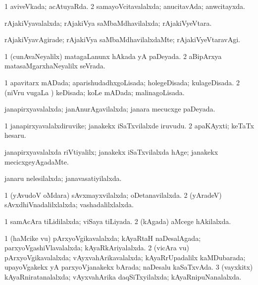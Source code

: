 \bentry
{} 
\gl{\gu}
\expl{}
\bmng
\bnum
\num{1} aviveVkada; acAtuyaRda. 
\num{2} samayoVcitavalalxda; anucitavAda; anwcitayxda. 
\enum
\emng
\eentry

\bentry
{} 
\gl{\gu}
\expl{}
\bmng
rAjakiVyavalalxda; rAjakiVya saMbaMdhavilalxda; rAjakiVyeVtara. 
\emng
\eentry

\bentry
{} 
\gl{\kirxvi}
\expl{}
\bmng
rAjakiVyavAgirade; rAjakiVya saMbaMdhavilalxdaMte; rAjakiVyeVtaravAgi. 
\emng
\eentry

\bentry
{} 
\gl{\gu}
\expl{}
\bmng
\bnum
\num{1} (cunAvaNeyalilx) matagaLanunx hAkada yA paDeyada. 
\num{2} aBipArxya matasaMgarxhaNeyalilx seVrada. 
\enum
\emng
\eentry

\bentry
{} 
\gl{\gu}
\expl{}
\bmng
\bnum
\num{1} apavitarx mADada; aparishudadhxgoLisada; holegeDisada; kulageDisada. 
\num{2} (niVru \mo vugaLa \vi) keDisada; koLe mADada; malinagoLisada. 
\enum
\emng
\eentry

\bentry
{} 
\gl{\gu}
\expl{}
\bmng
janapirxyavalalxda; janAnurAgavilalxda; janara mecucxge paDeyada. 
\emng
\eentry

\bentry
{} 
\gl{\nA}
\expl{}
\bmng
\bnum
\num{1} janapirxyavalalxdiruvike; janakekx iSaTxvilalxde iruvudu. 
\num{2} apaKAyxti; keTaTx hesaru. 
\enum
\emng
\eentry

\bentry
{} 
\gl{\kirxvi}
\expl{}
\bmng
janapirxyavalalxda riVtiyalilx; janakekx iSaTxvilalxda hAge; janakekx mecicxgeyAgadaMte. 
\emng
\eentry

\bentry
{} 
\gl{\gu}
\expl{}
\bmng
janaru nelesilalxda; janavasatiyilalxda. 
\emng
\eentry

\bentry
{} 
\gl{\gu}
\expl{}
\bmng
\bnum
\num{1} (yAvudoV oMdara) sAvxmayxvilalxda; oDetanavilalxda. 
\num{2} (yAradeV) sAvxdhiVnadalilxlalxda; vashadalilxlalxda. 
\enum
\emng
\eentry

\bentry
{} 
\gl{\gu}
\expl{}
\bmng
\bnum
\num{1} samAcAra tiLidilalxda; viSaya tiLiyada. 
\num{2} (kAgada) aMcege hAkilalxda. 
\enum
\emng
\eentry

\bentry
{} 
\gl{\gu}
\expl{}
\bmng
\bnum
\num{1} (haMcike \mo vu) pArxyoVgikavalalxda; kAyaRtaH naDesalAgada; parxyoVgashiVlavalalxda; kAyaRkAriyalalxda. 
\num{2} (vicAra \mo vu) pArxyoVgikavalalxda; vAyxvahArikavalalxda; kAyaRrUpadalilx kaMDubarada; upayoVgakekx yA parxyoVjanakekx bArada; naDesalu kaSaTxvAda. 
\num{3} (vayxkitx) kAyaRniratanalalxda; vAyxvahArika daqSiTxyilalxda; kAyaRnipuNanalalxda. 
\enum
\emng
\eentry

